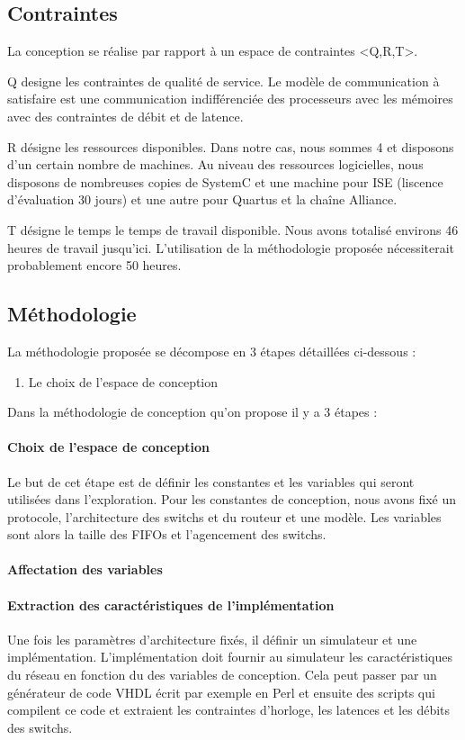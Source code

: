 \documentclass[11pt]{article}
\begin{document}
\subsection{Contraintes}

La conception se réalise par rapport à un espace de contraintes <Q,R,T>. 

Q designe les contraintes de qualité de service. Le modèle de communication à satisfaire est une communication indifférenciée des processeurs avec les mémoires avec des contraintes de débit et de latence.

R désigne les ressources disponibles. Dans notre cas, nous sommes 4 et disposons d'un certain nombre de machines. Au niveau des ressources logicielles, nous disposons de nombreuses copies de SystemC et une machine pour ISE (liscence d'évaluation 30 jours) et une autre pour Quartus et la chaîne Alliance.

T désigne le temps le temps de travail disponible. Nous avons totalisé environs 46 heures de travail jusqu'ici. L'utilisation de la méthodologie proposée nécessiterait probablement encore 50 heures.

\subsection{Méthodologie}

La méthodologie proposée se décompose en 3 étapes détaillées ci-dessous :
\begin{enumerate}
\item Le choix de l'espace de conception
\end{enumerate}

Dans la méthodologie de conception qu'on propose il y a 3 étapes : 
\paragraph{Choix de l'espace de conception}
Le but de cet étape est de définir les constantes et les variables qui seront utilisées dans l'exploration. Pour les constantes de conception, nous avons fixé un protocole, l'architecture des switchs et du routeur et une modèle. Les variables sont alors la taille des FIFOs et l'agencement des switchs.

\paragraph{Affectation des variables}

\paragraph{Extraction des caractéristiques de l'implémentation}
Une fois les paramètres d'architecture fixés, il définir un simulateur et une implémentation. L'implémentation doit fournir au simulateur les caractéristiques du réseau en fonction du des variables de conception. Cela peut passer par un générateur de code VHDL écrit par exemple en Perl et ensuite des scripts qui compilent ce code et extraient les contraintes d'horloge, les latences et les débits des switchs.
\end{document}
